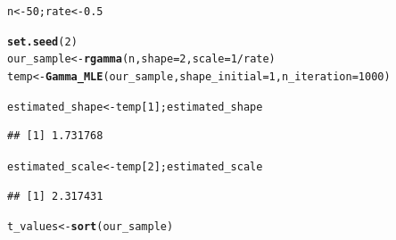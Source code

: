 \documentclass[11pt, a4paper]{article}\usepackage[]{graphicx}\usepackage[]{xcolor}
\makeatletter
\newcommand{\hlnum}[1]{\textcolor[rgb]{0.686,0.059,0.569}{#1}}%
\newcommand{\hlopt}[1]{\textcolor[rgb]{0,0,0}{#1}}%
\newcommand{\hldef}[1]{\textcolor[rgb]{0.345,0.345,0.345}{#1}}%
\newcommand{\hlkwb}[1]{\textcolor[rgb]{0.69,0.353,0.396}{#1}}%
\newcommand{\hlkwc}[1]{\textcolor[rgb]{0.333,0.667,0.333}{#1}}%
\newcommand{\hlkwd}[1]{\textcolor[rgb]{0.737,0.353,0.396}{\textbf{#1}}}%
\newenvironment{kframe}{%
 \def\at@end@of@kframe{}%
 \ifinner\ifhmode%
  \def\at@end@of@kframe{\end{minipage}}%
  \begin{minipage}{\columnwidth}%
 \fi\fi%
 \def\FrameCommand##1{\hskip\@totalleftmargin \hskip-\fboxsep
 \colorbox{shadecolor}{##1}\hskip-\fboxsep
     \hskip-\linewidth \hskip-\@totalleftmargin \hskip\columnwidth}%
 \MakeFramed {\advance\hsize-\width
   \@totalleftmargin\z@ \linewidth\hsize
   \@setminipage}}%
 {\par\unskip\endMakeFramed%
 \at@end@of@kframe}
\newenvironment{knitrout}{}{} %
\makeatother
\begin{document}
\begin{knitrout}
\color{fgcolor}\begin{kframe}
\begin{alltt}
\hldef{n} \hlkwb{<-} \hlnum{50}\hldef{; rate} \hlkwb{<-} \hlnum{0.5}

\hlkwd{set.seed}\hldef{(}\hlnum{2}\hldef{)}
\hldef{our_sample} \hlkwb{<-} \hlkwd{rgamma}\hldef{(n,} \hlkwc{shape} \hldef{=} \hlnum{2}\hldef{,} \hlkwc{scale} \hldef{=} \hlnum{1}\hlopt{/}\hldef{rate)}
\hldef{temp} \hlkwb{<-} \hlkwd{Gamma_MLE}\hldef{(our_sample,} \hlkwc{shape_initial} \hldef{=} \hlnum{1}\hldef{,} \hlkwc{n_iteration} \hldef{=} \hlnum{1000}\hldef{)}
\end{alltt}
\end{kframe}
\end{knitrout}

\begin{knitrout}
\color{fgcolor}\begin{kframe}
\begin{alltt}
\hldef{estimated_shape} \hlkwb{<-} \hldef{temp[}\hlnum{1}\hldef{]; estimated_shape}
\end{alltt}
\begin{verbatim}
## [1] 1.731768
\end{verbatim}
\end{kframe}
\end{knitrout}

\begin{knitrout}
\color{fgcolor}\begin{kframe}
\begin{alltt}
\hldef{estimated_scale} \hlkwb{<-} \hldef{temp[}\hlnum{2}\hldef{]; estimated_scale}
\end{alltt}
\begin{verbatim}
## [1] 2.317431
\end{verbatim}
\end{kframe}
\end{knitrout}

\begin{knitrout}
\color{fgcolor}\begin{kframe}
\begin{alltt}
\hldef{t_values} \hlkwb{<-} \hlkwd{sort}\hldef{(our_sample)}
\end{alltt}
\end{kframe}
\end{knitrout}
\end{document}
